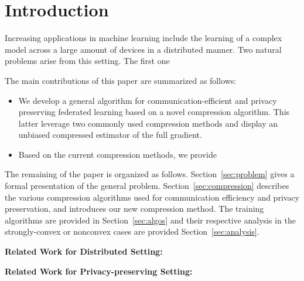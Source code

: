 \section{Introduction}
Increasing applications in machine learning include the learning of a complex model across a large amount of devices in a distributed manner.
Two natural problems arise from this setting. 
The first one 





The main contributions of this paper are summarized as follows:
\begin{itemize}
    \item We develop a general algorithm for communication-efficient and privacy preserving federated learning based on a novel compression algorithm. 
    This latter leverage two commonly used compression methods and display an unbiased compressed estimator of the full gradient.
    
    \item Based on the current compression methods, we provide 
\end{itemize}

The remaining of the paper is organized as follows.
Section~\ref{sec:problem} gives a formal presentation of the general problem. 
Section~\ref{sec:compression} describes the various compression algorithms used for communication efficiency and privacy preservation, and introduces our new compression method.
The training algorithms are provided in Section~\ref{sec:algos} and their respective analysis in the strongly-convex or nonconvex cases are provided Section~\ref{sec:analysis}.



 

\textbf{Related Work for Distributed Setting:} 


\textbf{Related Work for Privacy-preserving Setting:} 


